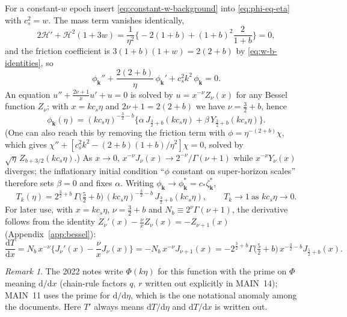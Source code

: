 \documentclass[11pt,a4paper]{article}
\newcommand{\cH}{\mathcal{H}}
\newcommand{\dd}{\mathrm{d}}
\newcommand{\vk}{\mathbf{k}}
\newcommand{\cstar}{c_{*}}
\newcommand{\note}[1]{\textsf{#1}}
\theoremstyle{remark}
\newtheorem*{remark}{Remark}
\begin{document}
For a constant-$w$ epoch insert \eqref{eq:constant-w-background} into \eqref{eq:phi-eq-eta} with $c_s^2 = w$. The mass term vanishes identically,
\[
2\cH' + \cH^2(1+3w) = \frac{1}{\eta^2}\Big\{-2(1+b) + (1+b)^2\frac{2}{1+b}\Big\} = 0 ,
\]
and the friction coefficient is $3(1+b)(1+w) = 2(2+b)$ by \eqref{eq:w-b-identities}, so
\begin{equation}
\phi_{\vk}'' + \frac{2(2+b)}{\eta}\,\phi_{\vk}' + c_s^2k^2\,\phi_{\vk} = 0 .
\label{eq:phi-eq-constant-w}
\end{equation}
An equation $u'' + \frac{2\nu+1}{x}u' + u = 0$ is solved by $u = x^{-\nu}Z_\nu(x)$ for any Bessel function $Z_\nu$; with $x = kc_s\eta$ and $2\nu+1 = 2(2+b)$ we have $\nu = \tfrac32+b$, hence
\begin{equation}
\phi_{\vk}(\eta) = (kc_s\eta)^{-\frac32-b}\Big\{\alpha\,J_{\frac32+b}(kc_s\eta) + \beta\,Y_{\frac32+b}(kc_s\eta)\Big\}.
\label{eq:phi-general}
\end{equation}
(One can also reach this by removing the friction term with $\phi = \eta^{-(2+b)}\chi$, which gives $\chi'' + [c_s^2k^2 - (2+b)(1+b)/\eta^2]\chi = 0$, solved by $\sqrt\eta\,Z_{b+3/2}(kc_s\eta)$.) As $x\to0$, $x^{-\nu}J_\nu(x)\to 2^{-\nu}/\Gamma(\nu+1)$ while $x^{-\nu}Y_\nu(x)$ diverges; the inflationary initial condition ``$\phi$ constant on super-horizon scales'' therefore sets $\beta = 0$ and fixes $\alpha$. Writing $\phi_{\vk}\to\phi^*_{\vk} = \cstar\zeta^*_{\vk}$,
\begin{equation}
\boxed{\;
T_k(\eta) = 2^{\frac32+b}\,\Gamma\!\big(\tfrac52+b\big)\,(kc_s\eta)^{-\frac32-b}\,J_{\frac32+b}(kc_s\eta),
\qquad T_k\to1\ \text{as } kc_s\eta\to0 .\;}
\label{eq:Tk-analytic}
\end{equation}
For later use, with $x = kc_s\eta$, $\nu = \tfrac32+b$ and $N_b\equiv2^{\nu}\Gamma(\nu+1)$, the derivative follows from the identity $Z_\nu'(x) - \tfrac{\nu}{x}Z_\nu(x) = -Z_{\nu+1}(x)$ (Appendix~\ref{app:bessel}):
\begin{equation}
\frac{\dd T}{\dd x} = N_b\,x^{-\nu}\Big\{J_\nu'(x) - \frac{\nu}{x}J_\nu(x)\Big\} = -N_b\,x^{-\nu}J_{\nu+1}(x)
= -2^{\frac32+b}\Gamma\!\big(\tfrac52+b\big)\,x^{-\frac32-b}J_{\frac52+b}(x).
\label{eq:dTdx}
\end{equation}

\begin{remark}
The 2022 notes write $\Phi(k\eta)$ for this function with the prime on $\Phi$ meaning $\dd/\dd x$ (chain-rule factors $q$, $r$ written out explicitly in \note{MAIN}~14); \note{MAIN}~11 uses the prime for $\dd/\dd\eta$, which is the one notational anomaly among the documents. Here $T'$ always means $\dd T/\dd\eta$ and $\dd T/\dd x$ is written out.
\end{remark}
\end{document}
